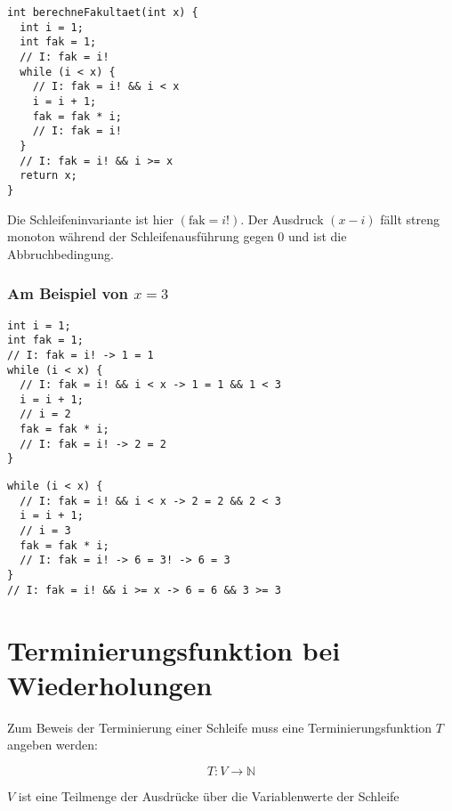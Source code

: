 \documentclass{bschlangaul-theorie}
\begin{document}
\begin{verbatim}
int berechneFakultaet(int x) {
  int i = 1;
  int fak = 1;
  // I: fak = i!
  while (i < x) {
    // I: fak = i! && i < x
    i = i + 1;
    fak = fak * i;
    // I: fak = i!
  }
  // I: fak = i! && i >= x
  return x;
}
\end{verbatim}

\noindent
Die Schleifeninvariante ist hier $(\text{fak} = i!)$. Der Ausdruck $(x -
i)$ fällt streng monoton während der Schleifenausführung gegen $0$ und
ist die Abbruchbedingung.

\subsubsection{Am Beispiel von $x = 3$}

\begin{multicols}{2}

\begin{verbatim}
int i = 1;
int fak = 1;
// I: fak = i! -> 1 = 1
while (i < x) {
  // I: fak = i! && i < x -> 1 = 1 && 1 < 3
  i = i + 1;
  // i = 2
  fak = fak * i;
  // I: fak = i! -> 2 = 2
}
\end{verbatim}


\begin{verbatim}
while (i < x) {
  // I: fak = i! && i < x -> 2 = 2 && 2 < 3
  i = i + 1;
  // i = 3
  fak = fak * i;
  // I: fak = i! -> 6 = 3! -> 6 = 3
}
// I: fak = i! && i >= x -> 6 = 6 && 3 >= 3
\end{verbatim}

\end{multicols}

%

\section{Terminierungsfunktion bei Wiederholungen}

Zum Beweis der Terminierung einer Schleife muss eine
Terminierungsfunktion $T$ angeben werden:

\begin{displaymath}
T \colon V \rightarrow \mathbb{N}
\end{displaymath}

\noindent
$V$ ist eine Teilmenge der Ausdrücke über die Variablenwerte der Schleife
\end{document}
